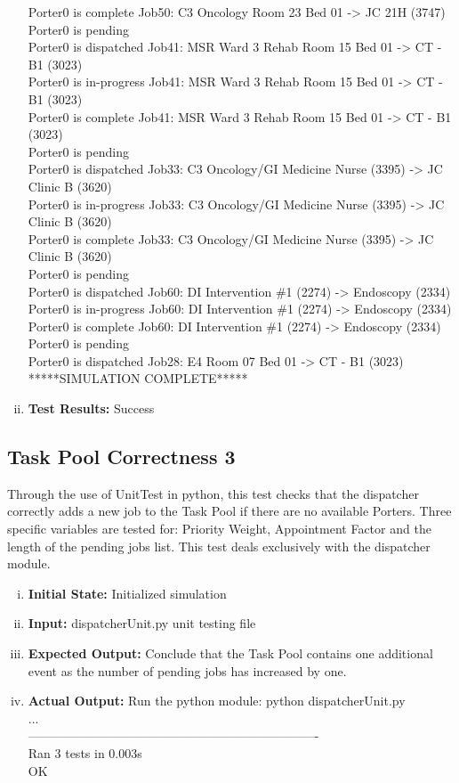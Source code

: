 \documentclass[paper=letter, fontsize=10pt]{scrartcl}
\numberwithin{equation}{section}		%
\numberwithin{figure}{section}			%
\numberwithin{table}{section}				%
\begin{document}
\begin{enumerate}[(i)]
Porter0 is complete Job50: C3 Oncology Room 23 Bed 01 -> JC 21H (3747)\\
Porter0 is pending\\
Porter0 is dispatched Job41: MSR Ward 3 Rehab Room 15 Bed 01 -> CT - B1 (3023)\\
Porter0 is in-progress Job41: MSR Ward 3 Rehab Room 15 Bed 01 -> CT - B1 (3023)\\
Porter0 is complete Job41: MSR Ward 3 Rehab Room 15 Bed 01 -> CT - B1 (3023)\\
Porter0 is pending\\
Porter0 is dispatched Job33: C3 Oncology/GI Medicine Nurse (3395) -> JC Clinic B (3620)\\
Porter0 is in-progress Job33: C3 Oncology/GI Medicine Nurse (3395) -> JC Clinic B (3620)\\
Porter0 is complete Job33: C3 Oncology/GI Medicine Nurse (3395) -> JC Clinic B (3620)\\
Porter0 is pending\\
Porter0 is dispatched Job60: DI Intervention \#1 (2274) -> Endoscopy (2334)\\
Porter0 is in-progress Job60: DI Intervention \#1 (2274) -> Endoscopy (2334)\\
Porter0 is complete Job60: DI Intervention \#1 (2274) -> Endoscopy (2334)\\
Porter0 is pending\\
Porter0 is dispatched Job28: E4 Room 07 Bed 01 -> CT - B1 (3023)\\
*****SIMULATION COMPLETE*****\\
	\item \textbf{Test Results:} Success
\end{enumerate}

\subsection{Task Pool Correctness 3}
Through the use of UnitTest in python, this test checks that the dispatcher correctly adds a new job to the Task Pool if there are no available Porters. Three specific variables are tested for: Priority Weight, Appointment Factor and the length of the pending jobs list. This test deals exclusively with the dispatcher module.
\begin{enumerate}[(i)]
	\item \textbf{Initial State:} Initialized simulation
	\item \textbf{Input:} dispatcherUnit.py unit testing file %
	\item \textbf{Expected Output:} Conclude that the Task Pool contains one additional event as the number of pending jobs has increased by one.
	\item \textbf{Actual Output:} Run the python module: python dispatcherUnit.py\\
...\\
----------------------------------------------------------------------\\
Ran 3 tests in 0.003s\\

OK
\end{enumerate}
\end{document}
